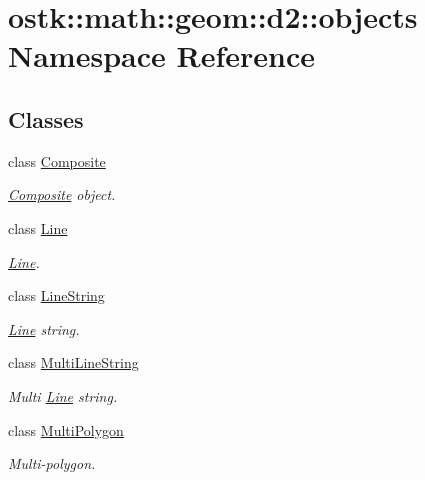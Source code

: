 \hypertarget{namespaceostk_1_1math_1_1geom_1_1d2_1_1objects}{}\section{ostk\+:\+:math\+:\+:geom\+:\+:d2\+:\+:objects Namespace Reference}
\label{namespaceostk_1_1math_1_1geom_1_1d2_1_1objects}
\subsection*{Classes}
\begin{DoxyCompactItemize}
\item 
class \hyperlink{classostk_1_1math_1_1geom_1_1d2_1_1objects_1_1_composite}{Composite}
\begin{DoxyCompactList}\small\item\em \hyperlink{classostk_1_1math_1_1geom_1_1d2_1_1objects_1_1_composite}{Composite} object. \end{DoxyCompactList}\item 
class \hyperlink{classostk_1_1math_1_1geom_1_1d2_1_1objects_1_1_line}{Line}
\begin{DoxyCompactList}\small\item\em \hyperlink{classostk_1_1math_1_1geom_1_1d2_1_1objects_1_1_line}{Line}. \end{DoxyCompactList}\item 
class \hyperlink{classostk_1_1math_1_1geom_1_1d2_1_1objects_1_1_line_string}{Line\+String}
\begin{DoxyCompactList}\small\item\em \hyperlink{classostk_1_1math_1_1geom_1_1d2_1_1objects_1_1_line}{Line} string. \end{DoxyCompactList}\item 
class \hyperlink{classostk_1_1math_1_1geom_1_1d2_1_1objects_1_1_multi_line_string}{Multi\+Line\+String}
\begin{DoxyCompactList}\small\item\em Multi \hyperlink{classostk_1_1math_1_1geom_1_1d2_1_1objects_1_1_line}{Line} string. \end{DoxyCompactList}\item 
class \hyperlink{classostk_1_1math_1_1geom_1_1d2_1_1objects_1_1_multi_polygon}{Multi\+Polygon}
\begin{DoxyCompactList}\small\item\em Multi-\/polygon. \end{DoxyCompactList}\item 

\end{DoxyCompactItemize}
